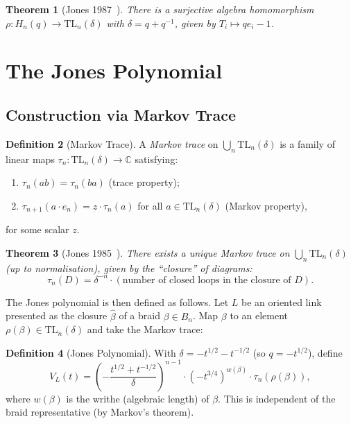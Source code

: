 \documentclass[12pt,a4paper]{amsart}
\newtheorem{theorem}{Theorem}[section]
\theoremstyle{definition}
\newtheorem{definition}[theorem]{Definition}
\theoremstyle{remark}
\begin{document}
\begin{theorem}[Jones 1987~\cite{Jones1987}]
There is a surjective algebra homomorphism $\rho \colon H_n(q) \to \mathrm{TL}_n(\delta)$
with $\delta = q + q^{-1}$, given by $T_i \mapsto q e_i - 1$.
\end{theorem}

\section{The Jones Polynomial}

\subsection{Construction via Markov Trace}

\begin{definition}[Markov Trace]
A \emph{Markov trace} on $\bigcup_n \mathrm{TL}_n(\delta)$ is a family of
linear maps $\tau_n \colon \mathrm{TL}_n(\delta) \to \mathbb{C}$ satisfying:
\begin{enumerate}[label=\roman*)]
\item $\tau_n(ab) = \tau_n(ba)$ (trace property);
\item $\tau_{n+1}(a \cdot e_n) = z \cdot \tau_n(a)$ for all
      $a \in \mathrm{TL}_n(\delta)$ (Markov property),
\end{enumerate}
for some scalar $z$.
\end{definition}

\begin{theorem}[Jones 1985~\cite{Jones1985}]
There exists a unique Markov trace on $\bigcup_n \mathrm{TL}_n(\delta)$
(up to normalisation), given by the ``closure'' of diagrams:
\[
    \tau_n(D) = \delta^{-n} \cdot (\text{number of closed loops in the closure of } D).
\]
\end{theorem}

The Jones polynomial is then defined as follows. Let $L$ be an oriented link
presented as the closure $\hat{\beta}$ of a braid $\beta \in B_n$.
Map $\beta$ to an element $\rho(\beta) \in \mathrm{TL}_n(\delta)$ and take
the Markov trace:

\begin{definition}[Jones Polynomial]
With $\delta = -t^{1/2} - t^{-1/2}$ (so $q = -t^{1/2}$), define
\[
    V_L(t) = \left( -\frac{t^{1/2} + t^{-1/2}}{\delta} \right)^{n-1}
    \cdot \left( -t^{3/4} \right)^{w(\beta)} \cdot \tau_n(\rho(\beta)),
\]
where $w(\beta)$ is the writhe (algebraic length) of $\beta$.
This is independent of the braid representative (by Markov's theorem).
\end{definition}
\end{document}
